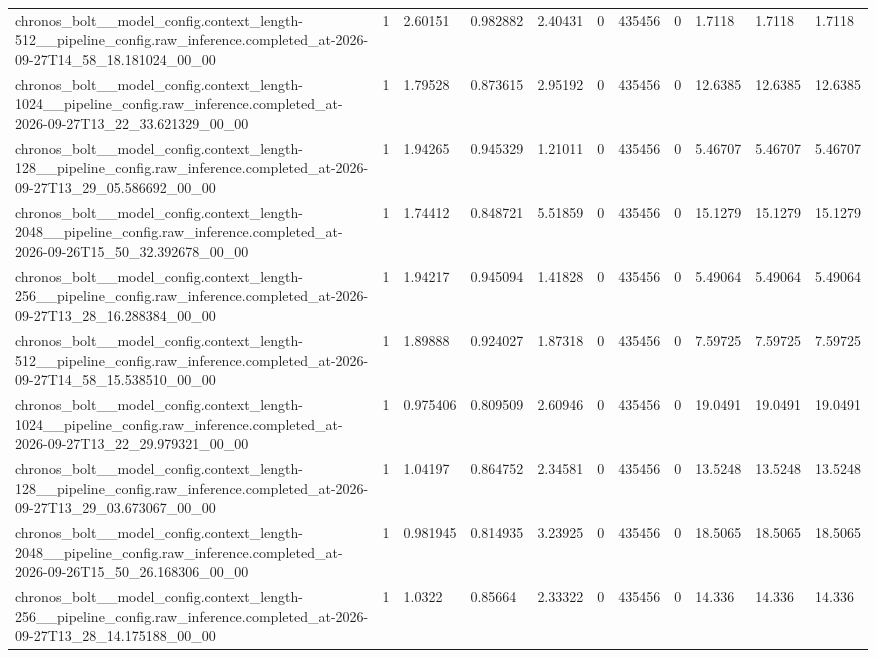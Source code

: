 \begin{tabular}{lllllllllll}
chronos\_bolt\_\_model\_config.context\_length-512\_\_pipeline\_config.raw\_inference.completed\_at-2026-09-27T14\_58\_18.181024\_00\_00 & 1 & 2.60151 & 0.982882 & 2.40431 & 0 & 435456 & 0 & 1.7118 & 1.7118 & 1.7118 \\
chronos\_bolt\_\_model\_config.context\_length-1024\_\_pipeline\_config.raw\_inference.completed\_at-2026-09-27T13\_22\_33.621329\_00\_00 & 1 & 1.79528 & 0.873615 & 2.95192 & 0 & 435456 & 0 & 12.6385 & 12.6385 & 12.6385 \\
chronos\_bolt\_\_model\_config.context\_length-128\_\_pipeline\_config.raw\_inference.completed\_at-2026-09-27T13\_29\_05.586692\_00\_00 & 1 & 1.94265 & 0.945329 & 1.21011 & 0 & 435456 & 0 & 5.46707 & 5.46707 & 5.46707 \\
chronos\_bolt\_\_model\_config.context\_length-2048\_\_pipeline\_config.raw\_inference.completed\_at-2026-09-26T15\_50\_32.392678\_00\_00 & 1 & 1.74412 & 0.848721 & 5.51859 & 0 & 435456 & 0 & 15.1279 & 15.1279 & 15.1279 \\
chronos\_bolt\_\_model\_config.context\_length-256\_\_pipeline\_config.raw\_inference.completed\_at-2026-09-27T13\_28\_16.288384\_00\_00 & 1 & 1.94217 & 0.945094 & 1.41828 & 0 & 435456 & 0 & 5.49064 & 5.49064 & 5.49064 \\
chronos\_bolt\_\_model\_config.context\_length-512\_\_pipeline\_config.raw\_inference.completed\_at-2026-09-27T14\_58\_15.538510\_00\_00 & 1 & 1.89888 & 0.924027 & 1.87318 & 0 & 435456 & 0 & 7.59725 & 7.59725 & 7.59725 \\
chronos\_bolt\_\_model\_config.context\_length-1024\_\_pipeline\_config.raw\_inference.completed\_at-2026-09-27T13\_22\_29.979321\_00\_00 & 1 & 0.975406 & 0.809509 & 2.60946 & 0 & 435456 & 0 & 19.0491 & 19.0491 & 19.0491 \\
chronos\_bolt\_\_model\_config.context\_length-128\_\_pipeline\_config.raw\_inference.completed\_at-2026-09-27T13\_29\_03.673067\_00\_00 & 1 & 1.04197 & 0.864752 & 2.34581 & 0 & 435456 & 0 & 13.5248 & 13.5248 & 13.5248 \\
chronos\_bolt\_\_model\_config.context\_length-2048\_\_pipeline\_config.raw\_inference.completed\_at-2026-09-26T15\_50\_26.168306\_00\_00 & 1 & 0.981945 & 0.814935 & 3.23925 & 0 & 435456 & 0 & 18.5065 & 18.5065 & 18.5065 \\
chronos\_bolt\_\_model\_config.context\_length-256\_\_pipeline\_config.raw\_inference.completed\_at-2026-09-27T13\_28\_14.175188\_00\_00 & 1 & 1.0322 & 0.85664 & 2.33322 & 0 & 435456 & 0 & 14.336 & 14.336 & 14.336 \\

\end{tabular}

